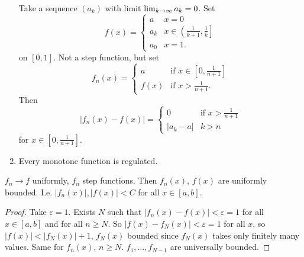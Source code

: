 \documentclass[10pt, a4paper]{article}
\begin{document}
\begin{example}
\begin{enumerate}[label = (\arabic*)]
        Take a sequence $(a_k)$ with limit $\liminfty[k]a_k = 0$.
        Set
        \[
        f(x) = \begin{cases}
            a & x = 0 \\
            a_k & x \in \left(\frac{1}{k + 1}, \frac{1}{k}\right] \\
            a_0 & x = 1.
        \end{cases}
        \]
        on $[0, 1]$.
        Not a step function,
        but set
        \[
        f_n(x) = \begin{cases}
            a &\text{if } x \in \left[0, \frac{1}{n + 1}\right] \\
            f(x) &\text{if } x > \frac{1}{n + 1}.
        \end{cases}
        \]
        Then
        \[
        |f_n(x) - f(x)| = \begin{cases}
            0 &\text{if } x > \frac{1}{n + 1} \\
            |a_k - a| & k > n
        \end{cases}
        \]
        for $x \in \left[0, \frac{1}{n + 1}\right]$.

        \item Every monotone function is regulated.
    \end{enumerate}
\end{example}

\begin{lemma}
    $f_n \to f$ uniformly,
    $f_n$ step functions.
    Then $f_n(x)$,
    $f(x)$ are uniformly bounded.
    I.e. $|f_n(x)|, |f(x)| < C$ for all $x \in [a, b]$.

    \begin{proof}
        Take $\varepsilon = 1$.
        Exists $N$ such that $|f_n(x) - f(x)| < \varepsilon = 1$ for all $x \in [a, b]$ and for all $n \geq N$.
        So $|f(x) - f_N(x)| < \varepsilon = 1$ for all $x$,
        so $|f(x)| < |f_N(x)| + 1$,
        $f_N(x)$ bounded since $f_N(x)$ takes only finitely many values.
        Same for $f_n(x)$,
        $n \geq N$.
        $f_1, \dotsc, f_{N - 1}$ are universally bounded.
    \end{proof}
\end{lemma}
\end{document}

